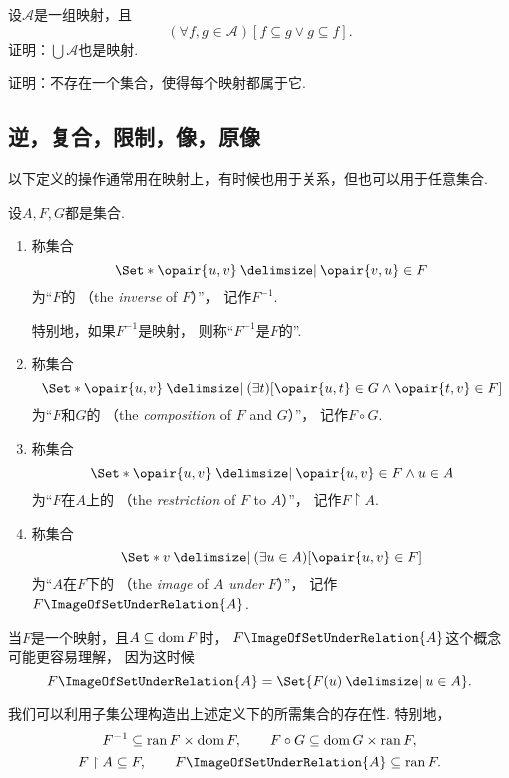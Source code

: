 \begin{example}
\def\A{\mathscr{A}}%
设\(\A\)是一组映射，且\[
	(\forall f,g\in\A)[f \subseteq g \lor g \subseteq f].
\]
证明：\(\bigcup\A\)也是映射.
\end{example}

\begin{example}
证明：不存在一个集合，使得每个映射都属于它.
\end{example}

\subsection{逆，复合，限制，像，原像}
以下定义的操作通常用在映射上，有时候也用于关系，但也可以用于任意集合.
\begin{definition}
设\(A,F,G\)都是集合.
\begin{enumerate}
	\item 称集合\[
		\Set*{ \opair{u,v} \given \opair{v,u} \in F }
	\]为“\(F\)的%
	（the \emph{inverse} of \(F\)）”，
	记作\(F^{-1}\).

	特别地，如果\(F^{-1}\)是映射，
	则称“\(F^{-1}\)是\(F\)的”.

	\item 称集合\[
		\Set*{ \opair{u,v} \given (\exists t)[\opair{u,t} \in G \land \opair{t,v} \in F] }
	\]为“\(F\)和\(G\)的%
	（the \emph{composition} of \(F\) and \(G\)）”，
	记作\(F \circ G\).

	\item 称集合\[
		\Set*{ \opair{u,v} \given \opair{u,v} \in F \land u \in A }
	\]为“\(F\)在\(A\)上的%
	（the \emph{restriction} of \(F\) to \(A\)）”，
	记作\(F \upharpoonright A\).

	\item 称集合\[
		\Set*{ v \given (\exists u \in A)[\opair{u,v} \in F] }
	\]为“\(A\)在\(F\)下的%
	（the \emph{image} of \(A\) \emph{under} \(F\)）”，
	记作\(F\ImageOfSetUnderRelation{A}\).
\end{enumerate}
\end{definition}

当\(F\)是一个映射，且\(A \subseteq \operatorname{dom} F\)时，
\(F\ImageOfSetUnderRelation{A}\)这个概念可能更容易理解，
因为这时候\[
	F\ImageOfSetUnderRelation{A}
	= \Set{ F(u) \given u \in A }.
\]

我们可以利用子集公理构造出上述定义下的所需集合的存在性.
特别地，\[
	F^{-1} \subseteq \operatorname{ran} F \times \operatorname{dom} F, \qquad
	F \circ G \subseteq \operatorname{dom} G \times \operatorname{ran} F,
\]\[
	F \upharpoonright A \subseteq F, \qquad
	F\ImageOfSetUnderRelation{A} \subseteq \ran F.
\]

